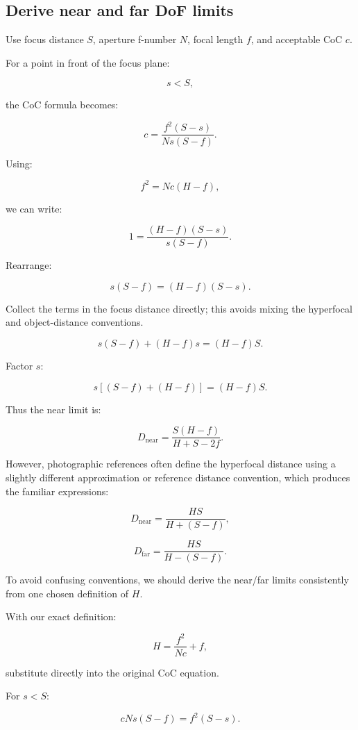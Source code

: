\subsection{Derive near and far DoF limits}\label{02-foundations-ii-ch036-derive-near-and-far-dof-limits}

\hypertarget{02-foundations-ii-ch036-derive-near-and-far-dof-limits}{}

Use focus distance \(S\), aperture f-number \(N\), focal length \(f\), and acceptable CoC \(c\).

For a point in front of the focus plane:

\[ s<S, \]

the CoC formula becomes:

\[ c= \frac{f^2(S-s)}{Ns(S-f)}. \]

Using:

\[ f^2=Nc(H-f), \]

we can write:

\[ 1= \frac{(H-f)(S-s)}{s(S-f)}. \]

Rearrange:

\[ s(S-f)=(H-f)(S-s). \]

Collect the terms in the focus distance directly; this avoids mixing the hyperfocal and object-distance conventions.

\[ s(S-f)+(H-f)s=(H-f)S. \]

Factor \(s\):

\[ s[(S-f)+(H-f)]=(H-f)S. \]

Thus the near limit is:

\[ \boxed{ D_{\mathrm{near}} = \frac{S(H-f)}{H+S-2f}. } \]

However, photographic references often define the hyperfocal distance using a slightly different approximation or reference distance convention, which produces the familiar expressions:

\[ \boxed{ D_{\mathrm{near}} = \frac{HS}{H+(S-f)}, } \]

\[ \boxed{ D_{\mathrm{far}} = \frac{HS}{H-(S-f)}. } \]

To avoid confusing conventions, we should derive the near/far limits consistently from one chosen definition of \(H\).

With our exact definition:

\[ H=\frac{f^2}{Nc}+f, \]

substitute directly into the original CoC equation.

For \(s<S\):

\[ cNs(S-f)=f^2(S-s). \]

